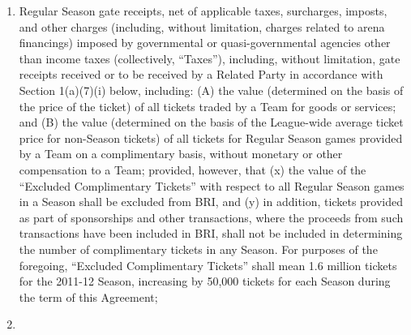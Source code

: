 \documentclass[
]{book}
\providecommand{\tightlist}{%
  \setlength{\itemsep}{0pt}\setlength{\parskip}{0pt}}
\begin{document}
\begin{enumerate}
\begin{enumerate}
    \begin{enumerate}
    \def\labelenumiii{(\roman{enumiii})}
    \tightlist
    \item
      Regular Season gate receipts, net of applicable taxes, surcharges, imposts, and other charges (including, without limitation, charges related to arena financings) imposed by governmental or quasi-governmental agencies other than income taxes (collectively, ``Taxes''), including, without limitation, gate receipts received or to be received by a Related Party in accordance with Section 1(a)(7)(i) below, including: (A) the value (determined on the basis of the price of the ticket) of all tickets traded by a Team for goods or services; and (B) the value (determined on the basis of the League-wide average ticket price for non-Season tickets) of all tickets for Regular Season games provided by a Team on a complimentary basis, without monetary or other compensation to a Team; provided, however, that (x) the value of the ``Excluded Complimentary Tickets'' with respect to all Regular Season games in a Season shall be excluded from BRI, and (y) in addition, tickets provided as part of sponsorships and other transactions, where the proceeds from such transactions have been included in BRI, shall not be included in determining the number of complimentary tickets in any Season. For purposes of the foregoing, ``Excluded Complimentary Tickets'' shall mean 1.6 million tickets for the 2011-12 Season, increasing by 50,000 tickets for each Season during the term of this Agreement;
    \item

\end{enumerate}
\end{enumerate}
\end{enumerate}
\end{document}
